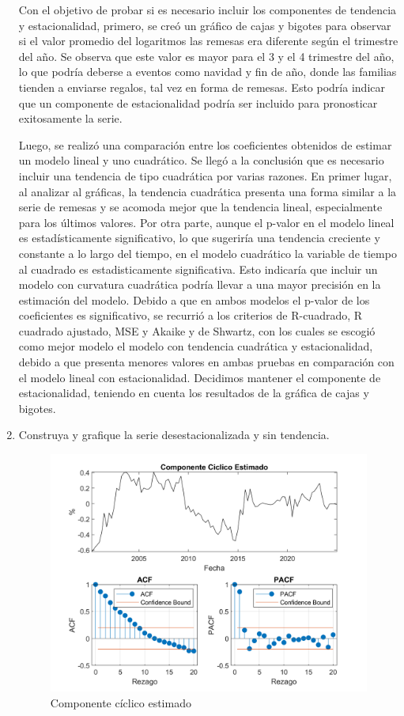 \documentclass{article}
\theoremstyle{remark}
\theoremstyle{definition}
\begin{document}
\begin{enumerate}[label=\emph{\alph*})]
\begin{tcolorbox}[title=Soluci\'on 3.c]
Con el objetivo de probar si es necesario incluir los componentes de tendencia y estacionalidad, primero, se creó un gráfico de cajas y bigotes para observar si el valor promedio del logaritmos las remesas era diferente según el trimestre del año. Se observa que este valor es mayor para el 3 y el 4 trimestre del año, lo que podría deberse a eventos como navidad y fin de año, donde las familias tienden a enviarse regalos, tal vez en forma de remesas. Esto podría indicar que un componente de estacionalidad podría ser incluido para pronosticar exitosamente la serie. 

\bigskip Luego, se realizó una comparación entre los coeficientes obtenidos de estimar un modelo lineal y uno cuadrático. Se llegó a la conclusión que es necesario incluir una tendencia de tipo cuadrática por varias razones. En primer lugar, al analizar al gráficas, la tendencia cuadrática presenta una forma similar a la serie de remesas y se acomoda mejor que la tendencia lineal, especialmente para los últimos valores. Por otra parte, aunque el p-valor en el modelo lineal es estadísticamente significativo, lo que sugeriría una tendencia creciente y constante a lo largo del tiempo, en el modelo cuadrático la variable de tiempo al cuadrado es estadisticamente significativa. Esto indicaría que incluir un modelo con curvatura cuadrática podría llevar a una mayor precisión en la estimación del modelo. Debido a que en ambos modelos el p-valor de los coeficientes es significativo, se recurrió a los criterios de R-cuadrado, R cuadrado ajustado, MSE y Akaike y de Shwartz, con los cuales se escogió como mejor modelo el modelo con tendencia cuadrática y estacionalidad, debido a que presenta menores valores en ambas pruebas en comparación con el modelo lineal con estacionalidad. Decidimos mantener el componente de estacionalidad, teniendo en cuenta los resultados de la gráfica de cajas y bigotes. 

        \end{tcolorbox}
    \item {Construya y grafique la serie desestacionalizada y sin tendencia.}
        \begin{tcolorbox}[title=Soluci\'on 3.d]
            \begin{figure}[H]
                \centering
                \includegraphics[width=0.5\linewidth]{docs/Serie_desestacionalizada.png}
                \caption{Componente cíclico estimado}
                \label{fig:enter-label}
            \end{figure}
            

\end{tcolorbox}
\end{enumerate}
\end{document}
